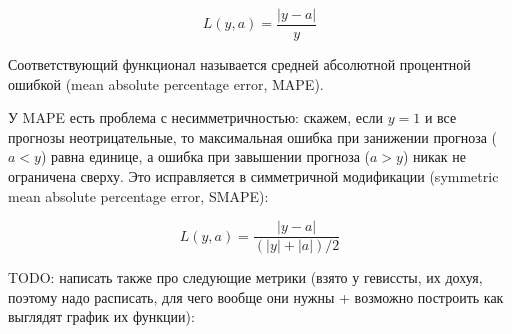 \[
  L(y, a) = \frac{|y - a|}{y}
\]

Соответствующий функционал называется средней абсолютной процентной
ошибкой (mean absolute percentage error, MAPE).

У MAPE есть проблема с несимметричностью: скажем, если $y = 1$ и все
прогнозы неотрицательные, то максимальная ошибка при занижении
прогноза ($a < y$) равна единице, а ошибка при завышении прогноза ($a
> y$) никак не ограничена сверху. Это исправляется в симметричной
модификации (symmetric mean absolute percentage error, SMAPE):

\[
  L(y, a) = \frac{|y - a|}{(|y| + |a|)/2}
\]

TODO: написать также про следующие метрики (взято у гевиссты, их
  дохуя, поэтому надо расписать, для чего вообще они нужны + возможно
построить как выглядят график их функции):

